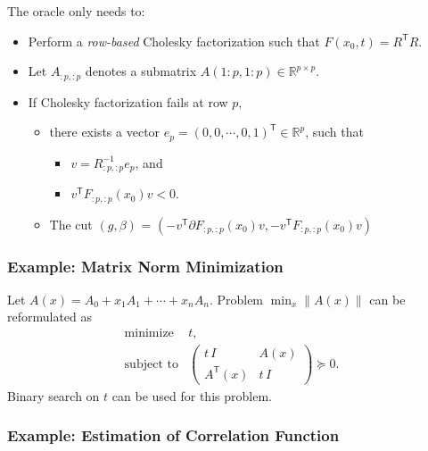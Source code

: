 \documentclass[final,leqno]{siamltex}
\providecommand{\tightlist}{%
  \setlength{\itemsep}{0pt}\setlength{\parskip}{0pt}}
\begin{document}
The oracle only needs to:

\begin{itemize}
\tightlist
\item
  Perform a \emph{row-based} Cholesky factorization such that
  \(F(x_0, t) = R^\mathsf{T} R\).
\item
  Let \(A_{:p,:p}\) denotes a submatrix
  \(A(1:p, 1:p) \in \mathbb{R}^{p\times p}\).
\item
  If Cholesky factorization fails at row \(p\),

  \begin{itemize}
  \tightlist
  \item
    there exists a vector
    \(e_p = (0, 0, \cdots, 0, 1)^\mathsf{T} \in \mathbb{R}^p\), such that

    \begin{itemize}
    \tightlist
    \item
      \(v = R_{:p,:p}^{-1} e_p\), and
    \item
      \(v^\mathsf{T} F_{:p,:p}(x_0) v < 0\).
    \end{itemize}
  \item
    The cut \((g, \beta)\) =
    \((-v^\mathsf{T} \partial F_{:p,:p}(x_0) v, -v^\mathsf{T} F_{:p,:p}(x_0) v)\)
  \end{itemize}
\end{itemize}

\hypertarget{sec:example-matrix-norm-minimization}{%
\subsubsection{Example: Matrix Norm Minimization}\label{sec:example-matrix-norm-minimization}}

Let \(A(x) = A_0 + x_1 A_1 + \cdots + x_n A_n\). Problem \(\min_x \| A(x) \|\) can be reformulated as
\[\begin{array}{ll}
    \text{minimize}      & t, \\
    \text{subject to}    & \left(
                            \begin{array}{cc}
                             t\,I   & A(x) \\
                             A^\mathsf{T}(x) & t\,I
                            \end{array} \right) \succeq 0.
  \end{array}
\]
Binary search on \(t\) can be used for this problem.

\hypertarget{sec:example-estimation-of-correlation-function}{%
\subsubsection{Example: Estimation of Correlation Function}\label{sec:example-estimation-of-correlation-function}}
\end{document}

